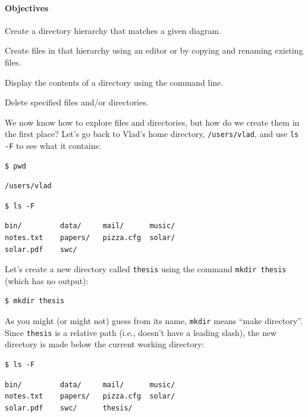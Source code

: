 \documentclass{book}
\begin{document}
\mbox{}\paragraph{Objectives}

\begin{swcitemize}
\item
  Create a directory hierarchy that matches a given diagram.
\item
  Create files in that hierarchy using an editor or by copying and
  renaming existing files.
\item
  Display the contents of a directory using the command line.
\item
  Delete specified files and/or directories.
\end{swcitemize}

We now know how to explore files and directories, but how do we create
them in the first place? Let's go back to Vlad's home directory,
\texttt{/users/vlad}, and use \texttt{ls -F} to see what it contains:

\begin{verbatim}
$ pwd
\end{verbatim}

\begin{verbatim}
/users/vlad
\end{verbatim}

\begin{verbatim}
$ ls -F
\end{verbatim}

\begin{verbatim}
bin/         data/     mail/      music/
notes.txt    papers/   pizza.cfg  solar/
solar.pdf    swc/
\end{verbatim}

Let's create a new directory called \texttt{thesis} using the command
\texttt{mkdir thesis} (which has no output):

\begin{verbatim}
$ mkdir thesis
\end{verbatim}

As you might (or might not) guess from its name, \texttt{mkdir} means
``make directory''. Since \texttt{thesis} is a relative path (i.e.,
doesn't have a leading slash), the new directory is made below the
current working directory:

\begin{verbatim}
$ ls -F
\end{verbatim}

\begin{verbatim}
bin/         data/     mail/      music/
notes.txt    papers/   pizza.cfg  solar/
solar.pdf    swc/      thesis/
\end{verbatim}
\end{document}
